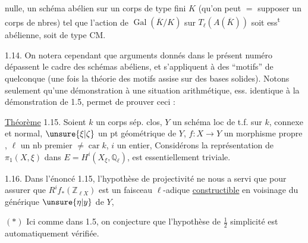 nulle,  un schéma abélien sur un corps de type fini $K$ (qu'on peut $=$ supposer un corps de nbres) tel que l'action de $\operatorname{Gal}(\overline K/K)$ sur $T_\ell(A(\overline K))$ soit ess\textsuperscript{t} abélienne,  soit de type CM.

1.14. On notera cependant que   arguments donnés dans le présent numéro dépassent le cadre des schémas abéliens, et s'appliquent   à des ``motifs'' de   quelconque (une fois la théorie des motifs assise sur des bases solides). Notons seulement qu'une démonstration  à une situation arithmétique, ess. identique à la démonstration de 1.5, permet de prouver ceci :

\uline{Théorème} 1.15. Soient $k$ un corps sép. clos, $Y$ un schéma   loc de t.f. sur $k$,  connexe et normal, $\unsure{\xi|\zeta}$ un pt géométrique de $Y$, $f:X\longrightarrow Y$ un morphisme propre , $\ell$ un nb premier $\ne\operatorname{car} k$,  $i$ un entier,  Considérons la représentation de $\pi_1(X,\xi)$ dans $E=H^i(X_\xi,\mathbb{Q}_\ell)$,        est essentiellement triviale. 

1.16. Dans l'énoncé 1.15, l'hypothèse de projectivité ne nous a servi que pour assurer que  $R^i f_*(\mathbb{Z}_{\ell X})$ est un faisceau $\ell$-adique \uline{constructible} en voisinage du  générique $\unsure{\eta|y}$ de $Y$,

$(*)$ Ici  comme dans 1.5, on conjecture  que l'hypothèse de $\frac12$ simplicité est automatiquement vérifiée.
